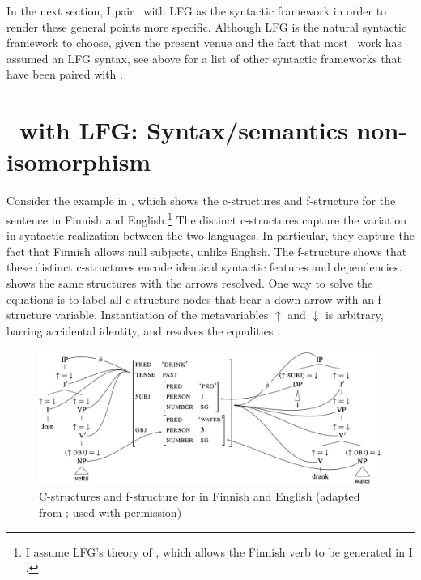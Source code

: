 \documentclass[output=paper,hidelinks]{langscibook}
\begin{document}
In the next section, I pair \glue\ with LFG as the syntactic framework
in order to render these general points more
specific. Although LFG is the natural syntactic framework to choose,
given the present venue and the fact that most \glue\ work has assumed
an LFG syntax, see 
 above for a list of other syntactic
frameworks that have been paired with \glue.

\section{\glue\ with  LFG: Syntax/semantics non-isomorphism}
\label{sec:glue-lfg} 


Consider the example in
, which shows the c-structures and
f-structure for the sentence  in Finnish and
English.\footnote{I assume LFG's theory of ,
  which allows the Finnish verb to be generated in I
  \citep[ch.\,6--7]{BresnanEtAl2016,BresnanEtAl2016}.}  The distinct 
c-structures capture the variation in syntactic realization between
the two languages. In particular, they capture the fact that Finnish allows null subjects,
unlike English. The f-structure shows that these
distinct c-structures encode identical syntactic features and
dependencies. 
shows the same structures with the arrows resolved. One way to solve
the equations is to label all c-structure nodes that bear a down arrow
with an f-structure variable. Instantiation of the metavariables
$\uparrow$ %
and $\downarrow$ is arbitrary, barring accidental identity, and
resolves the equalities \citep[54--58]{BresnanEtAl2016}. 

\begin{figure}
  \centering
  \includegraphics[scale=.32]{figures/Glue/finnish-english-1.png}
  \caption{C-structures and f-structure for  in 
    Finnish and English (adapted from
    \citealt[27]{asudeh;toivonen15-lfg}; used with permission)}
  \label{fig:finn-eng1} 
\end{figure}
\end{document}
